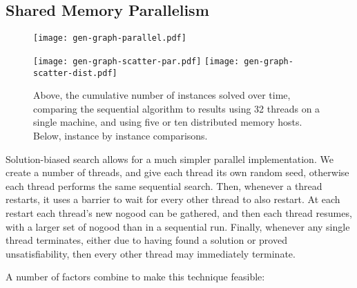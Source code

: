 \documentclass[runningheads]{llncs}
\begin{document}
\subsection{Shared Memory Parallelism}

\begin{figure}[tb]
    \texttt{[image: gen-graph-parallel.pdf]}

    \medskip

    \texttt{[image: gen-graph-scatter-par.pdf]}
    \hfill
    \texttt{[image: gen-graph-scatter-dist.pdf]}

    \caption{Above, the cumulative number of instances solved over time, comparing the sequential
    algorithm to results using 32 threads on a single machine, and using five or ten distributed
    memory hosts. Below, instance by instance comparisons.}\label{figure:parallel}
\end{figure}

Solution-biased search allows for a much simpler parallel implementation. We
create a number of threads, and give each thread its own random seed, otherwise each thread
performs the same sequential search. Then, whenever a thread restarts, it uses a barrier to wait for
every other thread to also restart. At each restart each thread's new nogood can be gathered, and
then each thread resumes, with a larger set of nogood than in a sequential run. Finally, whenever
any single thread terminates, either due to having found a solution or proved unsatisfiability,
then every other thread may immediately terminate.

A number of factors combine to make this technique feasible:
\end{document}
